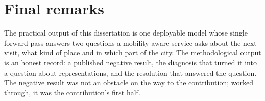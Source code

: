 \section{Final remarks}
\label{sec:conc:final}

The practical output of this dissertation is one deployable model whose single
forward pass answers two questions a mobility-aware service asks about the next
visit, what kind of place and in which part of the city. The methodological output is
an honest record: a published negative result, the diagnosis that turned it into a
question about representations, and the resolution that answered the question. The
negative result was not an obstacle on the way to the contribution; worked through,
it was the contribution's first half.
